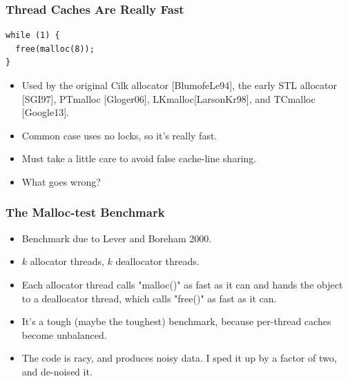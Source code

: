 \documentclass[xcolor=dvipsnames,14pt]{beamer}
\begin{document}
\begin{frame}[fragile]
\frametitle{Thread Caches Are Really Fast}

\begin{verbatim}
while (1) {
  free(malloc(8));
}
\end{verbatim}

\begin{itemize}
\item Used by the original Cilk allocator 
[BlumofeLe94], the early STL allocator [SGI97], PTmalloc [Gloger06], LKmalloc[LarsonKr98], and TCmalloc [Google13].


\item Common case uses no locks, so it's really fast.
\item Must take a little care to avoid false cache-line sharing.
\item What goes wrong?
\end{itemize}
\end{frame}

\begin{frame}[fragile]
\frametitle{The Malloc-test Benchmark}

\begin{itemize}
\item Benchmark due to Lever and Boreham 2000.

\item $k$ allocator threads, $k$ deallocator threads.

\item Each allocator thread calls "malloc()" as fast as it can and hands the object to a deallocator thread, which calls "free()" as fast as it can.

\item It's a tough (maybe the toughest) benchmark, because per-thread caches become unbalanced.

\item The code is racy, and produces noisy data.  I sped it up by a factor of two, and de-noised it.
\end{itemize}

\end{frame}
\end{document}
